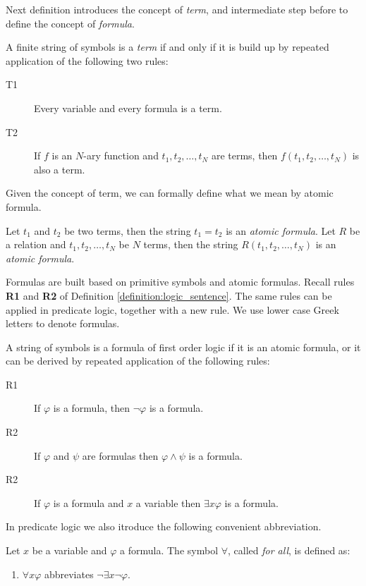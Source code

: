 Next definition introduces the concept of \emph{term}, and intermediate step before to define the concept of \emph{formula}.

\begin{definition}
A finite string of symbols is a \emph{term} if and only if it is build up by repeated application of the following two rules:
\begin{description}
\item[T1] Every variable and every formula is a term.
\item[T2] If $f$ is an $N$-ary function and $t_1, t_2, \ldots, t_N$ are terms, then $f(t_1, t_2, \ldots, t_N)$ is also a term.
\end{description}
\end{definition}

Given the concept of term, we can formally define what we mean by atomic formula.

\begin{definition}
Let $t_1$ and $t_2$ be two terms, then the string $t_1 = t_2$ is an \emph{atomic formula}.
Let $R$ be a relation and $t_1, t_2, \ldots, t_N$ be $N$ terms, then the string $R(t_1, t_2, \ldots, t_N)$ is an \emph{atomic formula}.
\end{definition}

Formulas are built based on primitive symbols and atomic formulas. Recall rules \textbf{R1} and \textbf{R2} of Definition \ref{definition:logic_sentence}. The same rules can be applied in predicate logic, together with a new rule. We use lower case Greek letters to denote formulas.

\begin{definition}
A string of symbols is a formula of first order logic if it is an atomic formula, or it can be derived by repeated application of the following rules:
\begin{description}
\item[R1] If $\varphi$ is a formula, then $\lnot \varphi$ is a formula.
\item[R2] If $\varphi$ and $\psi$ are formulas then $\varphi \land \psi$ is a formula.
\item[R2] If $\varphi$ is a formula and $x$ a variable then $\exists x \varphi$ is a formula.
\end{description}
\end{definition}

In predicate logic we also itroduce the following convenient abbreviation.

\begin{definition}
Let $x$ be a variable and $\varphi$ a formula. The symbol $\forall$, called \emph{for all}, is defined as:
\begin{enumerate}
\item $\forall x \varphi$ abbreviates $\lnot \exists x \lnot \varphi$.
\end{enumerate}
\end{definition}

